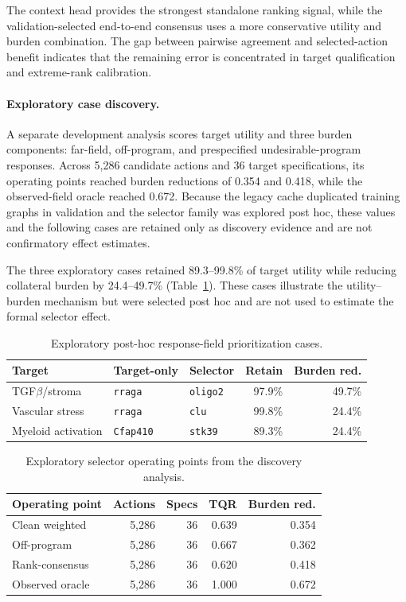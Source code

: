 \documentclass[sigconf,review,balance=false]{acmart}
\begin{document}
The context head provides the strongest standalone ranking signal, while the
validation-selected end-to-end consensus uses a more conservative utility and
burden combination. The gap between pairwise agreement and selected-action
benefit indicates that the remaining error is concentrated in target
qualification and extreme-rank calibration.

\paragraph{Exploratory case discovery.}
A separate development analysis scores target utility and three burden
components: far-field, off-program, and prespecified undesirable-program
responses. Across 5,286 candidate actions and 36 target specifications, its
operating points reached burden reductions of 0.354 and 0.418, while the
observed-field oracle reached 0.672. Because the legacy cache duplicated
training graphs in validation and the selector family was explored post hoc,
these values and the following cases are retained only as discovery evidence
and are not confirmatory effect estimates.

The three exploratory cases retained 89.3--99.8\% of target utility while
reducing collateral burden by 24.4--49.7\%
(Table~\ref{tab:app_selector_cases}). These cases illustrate the
utility--burden mechanism but were selected post hoc and are not used to
estimate the formal selector effect.

\begin{table}[t]
\centering
\scriptsize
\caption{Exploratory post-hoc response-field prioritization cases.}
\label{tab:app_selector_cases}
\setlength{\tabcolsep}{3pt}
\begin{tabular}{@{}lllrr@{}}
\toprule
Target & Target-only & Selector & Retain & Burden red. \\
\midrule
TGF$\beta$/stroma & \texttt{rraga} & \texttt{oligo2} & 97.9\% & 49.7\% \\
Vascular stress & \texttt{rraga} & \texttt{clu} & 99.8\% & 24.4\% \\
Myeloid activation & \texttt{Cfap410} & \texttt{stk39} & 89.3\% & 24.4\% \\
\bottomrule
\end{tabular}
\end{table}

\begin{table}[t]
\centering
\small
\caption{Exploratory selector operating points from the discovery analysis.}
\label{tab:app_selector_operating_points}
\setlength{\tabcolsep}{4pt}
\begin{tabular}{@{}lrrrr@{}}
\toprule
Operating point & Actions & Specs & TQR & Burden red. \\
\midrule
Clean weighted & 5,286 & 36 & 0.639 & 0.354 \\
Off-program & 5,286 & 36 & 0.667 & 0.362 \\
Rank-consensus & 5,286 & 36 & 0.620 & 0.418 \\
Observed oracle & 5,286 & 36 & 1.000 & 0.672 \\
\bottomrule
\end{tabular}
\end{table}
\end{document}
